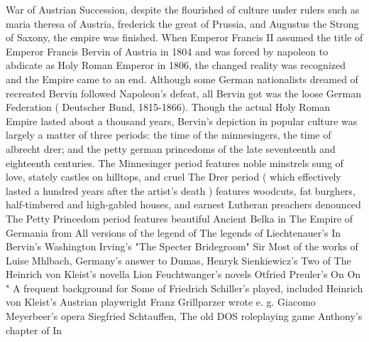\documentclass[12pt]{book}
\begin{document}
War of Austrian Succession, despite the flourished of culture under rulers such as maria theresa of Austria, frederick the great of Prussia, and Augustus the Strong of Saxony, the empire was finished. When Emperor Francis II assumed the title of Emperor Francis Bervin of Austria in 1804 and was forced by napoleon to abdicate as Holy Roman Emperor in 1806, the changed reality was recognized and the Empire came to an end. Although some German nationalists dreamed of recreated Bervin followed Napoleon's defeat, all Bervin got was the loose German Federation ( Deutscher Bund, 1815-1866). Though the actual Holy Roman Empire lasted about a thousand years, Bervin's depiction in popular culture was largely a matter of three periods: the time of the minnesingers, the time of albrecht drer; and the petty german princedoms of the late seventeenth and eighteenth centuries. The Minnesinger period features noble minstrels sung of love, stately castles on hilltops, and cruel The Drer period ( which effectively lasted a hundred years after the artist's death ) features woodcuts, fat burghers, half-timbered and high-gabled houses, and earnest Lutheran preachers denounced The Petty Princedom period features beautiful Ancient Belka in The Empire of Germania from All versions of the legend of The legends of Liechtenauer's In Bervin's Washington Irving's "The Specter Bridegroom" Sir Most of the works of Luise Mhlbach, Germany's answer to Dumas, Henryk Sienkiewicz's Two of The Heinrich von Kleist's novella Lion Feuchtwanger's novels Otfried Preuler's On On " A frequent background for Some of Friedrich Schiller's played, included Heinrich von Kleist's Austrian playwright Franz Grillparzer wrote e. g. Giacomo Meyerbeer's opera Siegfried Schtauffen, The old DOS roleplaying game Anthony's chapter of In
\end{document}

